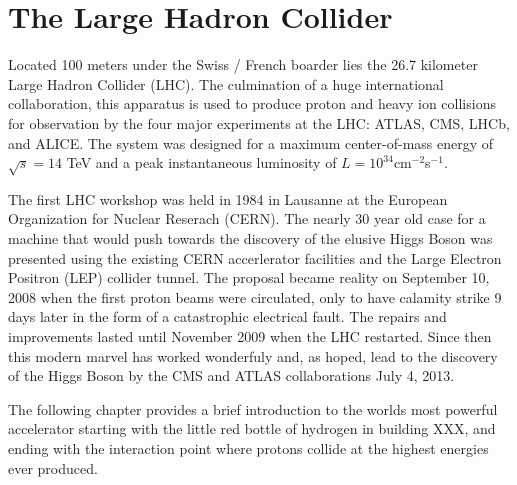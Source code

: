 \chapter{The Large Hadron Collider} \label{chap:lhc}

Located 100 meters under the Swiss / French boarder lies the 26.7 kilometer
Large Hadron Collider (LHC).  The culmination of a huge international collaboration,
this apparatus is used to produce proton and heavy ion collisions for observation by
the four major experiments at the LHC: ATLAS, CMS, LHCb, and ALICE.  The system
was designed for a maximum center-of-mass  energy of $\sqrt{s} = 14$ TeV and a peak
instantaneous luminosity of $L = 10^{34} $cm$^{-2} $s$^{-1}$.  

The first LHC workshop was held in 1984 in Lausanne at the European Organization
for  Nuclear Reserach (CERN).  The nearly 30 year old case for a machine that 
would push towards the discovery of the elusive Higgs Boson was presented using
the existing CERN accerlerator facilities and the Large Electron Positron (LEP)
collider tunnel. The proposal became reality on September 10, 2008 when the
first proton beams were circulated, only to have calamity strike 9 days later in
the form of a catastrophic electrical fault. The repairs and improvements lasted
until November 2009 when the LHC restarted.  Since then this modern marvel has
worked wonderfuly and, as hoped, lead to the discovery of the Higgs Boson by the
CMS and ATLAS collaborations July 4, 2013.

The following  chapter provides a brief introduction to the worlds
most powerful accelerator starting with the little red bottle of hydrogen in 
building XXX, and ending with the interaction point where protons collide at the 
highest energies ever produced.





